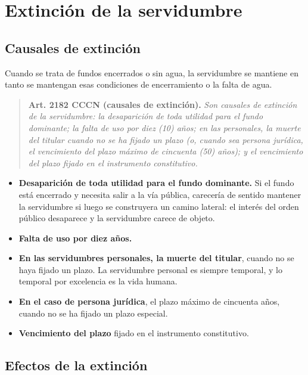 \documentclass[12pt,oneside]{book}
\begin{document}
\chapter{Extinción de la servidumbre}

\section{Causales de extinción}

Cuando se trata de fundos encerrados o sin agua, la servidumbre se mantiene en tanto se mantengan esas condiciones de encerramiento o la falta de agua.

\begin{quote}
\textbf{Art. 2182 CCCN (causales de extinción).} \textit{Son causales de extinción de la servidumbre: la desaparición de toda utilidad para el fundo dominante; la falta de uso por diez (10) años; en las personales, la muerte del titular cuando no se ha fijado un plazo (o, cuando sea persona jurídica, el vencimiento del plazo máximo de cincuenta (50) años); y el vencimiento del plazo fijado en el instrumento constitutivo.}
\end{quote}

\begin{itemize}
    \item \textbf{Desaparición de toda utilidad para el fundo dominante.} Si el fundo está encerrado y necesita salir a la vía pública, carecería de sentido mantener la servidumbre si luego se construyera un camino lateral: el interés del orden público desaparece y la servidumbre carece de objeto.
    \item \textbf{Falta de uso por diez años.}
    \item \textbf{En las servidumbres personales, la muerte del titular}, cuando no se haya fijado un plazo. La servidumbre personal es siempre temporal, y lo temporal por excelencia es la vida humana.
    \item \textbf{En el caso de persona jurídica}, el plazo máximo de cincuenta años, cuando no se ha fijado un plazo especial.
    \item \textbf{Vencimiento del plazo} fijado en el instrumento constitutivo.
\end{itemize}

\section{Efectos de la extinción}
\end{document}
